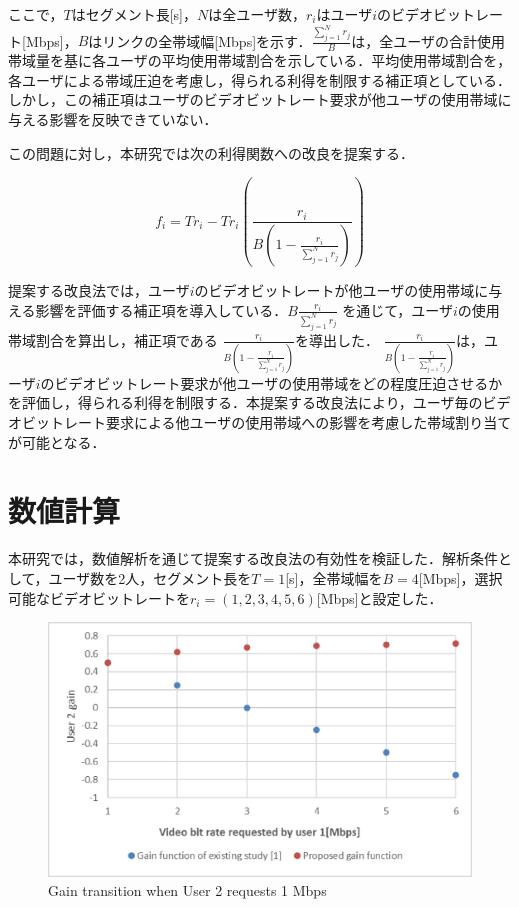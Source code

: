 \documentclass[twocolumn, a4paper]{ieicejsp}
\begin{document}
ここで，$T$はセグメント長[s]，$N$は全ユーザ数，$r_i$はユーザ$i$のビデオビットレート[Mbps]，$B$はリンクの全帯域幅[Mbps]を示す．$\frac{\sum^N_{j=1}r_j}{B}$は，全ユーザの合計使用帯域量を基に各ユーザの平均使用帯域割合を示している．平均使用帯域割合を，各ユーザによる帯域圧迫を考慮し，得られる利得を制限する補正項としている．しかし，この補正項はユーザのビデオビットレート要求が他ユーザの使用帯域に与える影響を反映できていない．

この問題に対し，本研究では次の利得関数への改良を提案する．
 
\begin{equation} 
     f_i=Tr_i-Tr_i\left(\frac{r_i}{B\left(1-\frac{r_i}{\sum^N_{j=1}r_j}\right)}\right) 
\end{equation}

提案する改良法では，ユーザ$i$のビデオビットレートが他ユーザの使用帯域に与える影響を評価する補正項を導入している．$B\frac{r_i}{\sum^N_{j=1}r_j}$
を通じて，ユーザ$i$の使用帯域割合を算出し\cite{johari}，補正項である
$\frac{r_i}{B\left(1-\frac{r_i}{\sum^N_{j=1}r_j}\right)}$を導出した．
$\frac{r_i}{B\left(1-\frac{r_i}{\sum^N_{j=1}r_j}\right)}$は，ユーザ$i$のビデオビットレート要求が他ユーザの使用帯域をどの程度圧迫させるかを評価し，得られる利得を制限する．本提案する改良法により，ユーザ毎のビデオビットレート要求による他ユーザの使用帯域への影響を考慮した帯域割り当てが可能となる．





\section{数値計算}
本研究では，数値解析を通じて提案する改良法の有効性を検証した．解析条件として，ユーザ数を2人，セグメント長を$T=1$[s]，全帯域幅を$B=4$[Mbps]，選択可能なビデオビットレートを$r_i=(1,2,3,4,5,6)$[Mbps]と設定した．


\begin{figure}[h]
  \centering
  \includegraphics[scale=0.22]{gurahu.eps}
            {Gain transition when User 2 requests 1 Mbps}
\end{figure}
\end{document}
